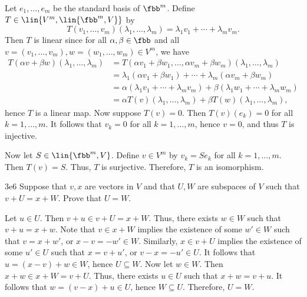 \begin{sol}
    Let $e_1, \ldots, e_m$ be the standard basis of $\fbb^m$.
	Define $T \in \lin{V^m, \lin{\fbb^m, V}}$ by
    \[
    	T(v_1, \ldots, v_m)(\lambda_1, \ldots, \lambda_m) = \lambda_1 v_1 + \cdots + \lambda_m v_m.
    \]
    Then $T$ is linear since for all $\alpha, \beta \in \fbb$ and all $v = (v_1, \ldots, v_m), w = (w_1, \ldots, w_m) \in V^m$, we have
    \begin{align*}
        T(\alpha v + \beta w)(\lambda_1, \ldots, \lambda_m) & = T(\alpha v_1 + \beta w_1, \ldots, \alpha v_m + \beta w_m)(\lambda_1, \ldots, \lambda_m) \\
        & = \lambda_1 (\alpha v_1 + \beta w_1) + \cdots + \lambda_m (\alpha v_m + \beta w_m) \\
        & = \alpha (\lambda_1 v_1 + \cdots + \lambda_m v_m) + \beta (\lambda_1 w_1 + \cdots + \lambda_m w_m)\\
        & = \alpha T(v)(\lambda_1, \ldots, \lambda_m) + \beta T(w)(\lambda_1, \ldots, \lambda_m),
    \end{align*}
    hence $T$ is a linear map.
	Now suppose $T(v) = 0$.
	Then $T(v)(e_k) = 0$ for all $k = 1, \ldots, m$.
	It follows that $v_k = 0$ for all $k = 1, \ldots, m$, hence $v = 0$, and thus $T$ is injective.

    Now let $S \in \lin{\fbb^m, V}$.
	Define $v \in V^m$ by $v_k = S e_k$ for all $k = 1, \ldots, m$.
	Then $T(v) = S$.
	Thus, $T$ is surjective.
	Therefore, $T$ is an isomorphism.
\end{sol}

\begin{exercise}{3e6}
    Suppose that $v, x$ are vectors in $V$ and that $U, W$ are subspaces of $V$ such that $v + U = x + W$.
	Prove that $U = W$.
\end{exercise}

\begin{sol}
    Let $u \in U$.
	Then $v + u \in v + U = x + W$.
	Thus, there exists $w \in W$ such that $v + u = x + w$.
	Note that $v \in x + W$ implies the existence of some $w' \in W$ such that $v = x + w'$, or $x - v = -w' \in W$.
	Similarly, $x \in v + U$ implies the existence of some $u' \in U$ such that $x = v + u'$, or $v - x = -u' \in U$.
	It follows that $u = (x - v) + w \in W$, hence $U \subseteq W$.
	Now let $w \in W$.
	Then $x + w \in x + W = v + U$.
	Thus, there exists $u \in U$ such that $x + w = v + u$.
	It follows that $w = (v - x) + u \in U$, hence $W \subseteq U$.
	Therefore, $U = W$.
\end{sol}

